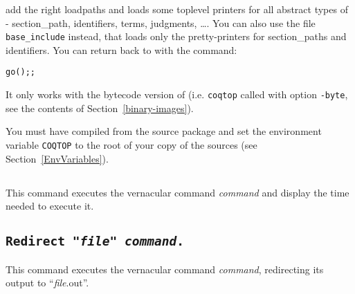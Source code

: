 \noindent add the right loadpaths and loads some toplevel printers for
all abstract types of \Coq - section\_path, identifiers, terms, judgments,
\dots. You can also use the file \texttt{base\_include} instead,
that loads only the pretty-printers for section\_paths and
identifiers.
You can return back to \Coq{} with the command: 

\begin{flushleft}
\begin{verbatim}
go();;
\end{verbatim}
\end{flushleft}

\begin{Warnings}
\item It only works with the bytecode version of {\Coq} (i.e. {\tt coqtop} called with option {\tt -byte}, see the contents of Section~\ref{binary-images}).
\item You must have compiled {\Coq} from the source package and set the
  environment variable \texttt{COQTOP} to the root of your copy of the sources (see Section~\ref{EnvVariables}).
\end{Warnings}

\subsection[\tt Time \textrm{\textsl{command}}.]{}
This command executes the vernacular command \textrm{\textsl{command}}
and display the time needed to execute it.

\subsection[\tt Redirect "\textrm{\textsl{file}}" \textrm{\textsl{command}}.]{\tt Redirect "\textrm{\textsl{file}}" \textrm{\textsl{command}}.
\label{redirect}}
This command executes the vernacular command \textrm{\textsl{command}}, redirecting its output to ``\textrm{\textsl{file}}.out''.

\subsection[\tt Timeout \textrm{\textsl{int}} \textrm{\textsl{command}}.]{}

